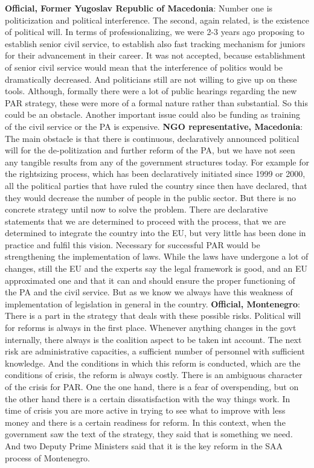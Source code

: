 \textbf{Official, Former Yugoslav Republic of Macedonia}: Number one is politicization and political interference. The second, again related, is the existence of political will. In terms of professionalizing, we were 2-3 years ago proposing to establish senior civil service, to establish also fast tracking mechanism for juniors for their advancement in their career. It was not accepted, because establishment of senior civil service would mean that the interference of politics would be dramatically decreased. And politicians still are not willing to give up on these tools. Although, formally there were a lot of public hearings regarding the new PAR strategy, these were more of a formal nature rather than substantial. So this could be an obstacle. Another important issue could also be funding as training of the civil service or the PA is expensive.
\textbf{NGO representative,  Macedonia}: The main obstacle is that there is continuous, declaratively announced political will for the de-politization and further reform of the PA, but we have not seen any tangible results from any of the government structures today. For example for the rightsizing process, which has been declaratively initiated since 1999 or 2000, all the political parties that have ruled the country since then have declared, that they would decrease the number of people in the public sector. But there is no concrete strategy until now to solve the problem. There are declarative statements that we are determined to proceed with the process, that we are determined to integrate the country into the EU, but very little has been done in practice and fulfil this vision. Necessary for successful PAR would be strengthening the implementation of laws. While the laws have undergone a lot of changes, still the EU and the experts say the legal framework is good, and an EU approximated one and that it can and should ensure the proper functioning of the PA and the civil service. But as we know we always have this weakness of implementation of legislation in general in the country.
\textbf{Official, Montenegro}: There is a part in the strategy that deals with these possible risks. Political will for reforms is always in the first place. Whenever anything changes in the govt internally, there always is the coalition aspect to be taken int account. The next risk are administrative capacities, a sufficient number of personnel with sufficient knowledge. And the conditions in which this reform is conducted, which are the conditions of crisis, the reform is always costly. There is an ambiguous character of the crisis for PAR. One the one hand, there is a fear of overspending, but on the other hand there is a certain dissatisfaction with the way things work. In time of crisis you are more active in trying to see what to improve with less money and there is a certain readiness for reform. In this context, when the government saw the text of the strategy, they said that is something we need. And two Deputy Prime Ministers said that it is the key reform in the SAA process of Montenegro.
